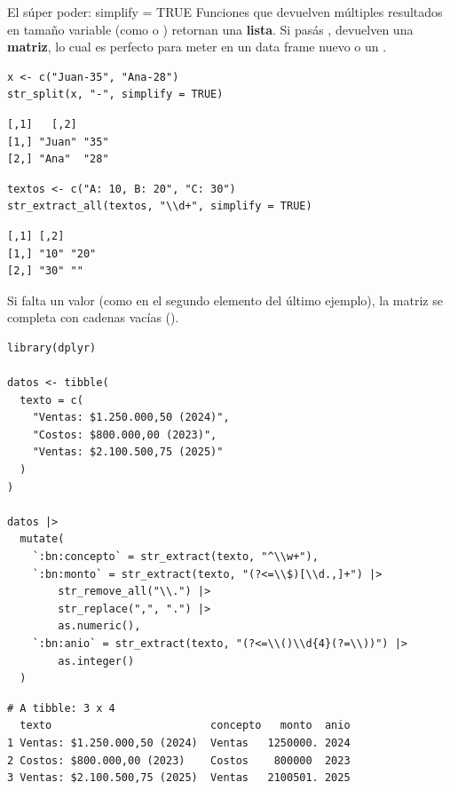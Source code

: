 \documentclass[8pt]{beamer}
\begin{document}
\begin{frame}[fragile]{El súper poder: simplify = TRUE}
	Funciones que devuelven múltiples resultados en tamaño variable (como  o ) retornan una \textbf{lista}. Si pasás , devuelven una \textbf{matriz}, lo cual es perfecto para meter en un data frame nuevo o un .
\begin{lstlisting}[style=RScript]
x <- c("Juan-35", "Ana-28")
str_split(x, "-", simplify = TRUE)
\end{lstlisting}
\begin{lstlisting}[style=RConsole]
     [,1]   [,2]
[1,] "Juan" "35"
[2,] "Ana"  "28"
\end{lstlisting}
\begin{lstlisting}[style=RScript]
textos <- c("A: 10, B: 20", "C: 30")
str_extract_all(textos, "\\d+", simplify = TRUE)
\end{lstlisting}
\begin{lstlisting}[style=RConsole]
     [,1] [,2]
[1,] "10" "20"
[2,] "30" ""
\end{lstlisting}
	\begin{alertblock}{}
		Si falta un valor (como en el segundo elemento del último ejemplo), la matriz se completa con cadenas vacías ().
	\end{alertblock}
\end{frame}




\begin{frame}[fragile]
\begin{lstlisting}[style=RScript, numbers=none]
library(dplyr)

datos <- tibble(
  texto = c(
    "Ventas: $1.250.000,50 (2024)",
    "Costos: $800.000,00 (2023)",
    "Ventas: $2.100.500,75 (2025)"
  )
)

datos |>
  mutate(
    `:bn:concepto` = str_extract(texto, "^\\w+"),
    `:bn:monto` = str_extract(texto, "(?<=\\$)[\\d.,]+") |>
      	str_remove_all("\\.") |>
      	str_replace(",", ".") |>
      	as.numeric(),
    `:bn:anio` = str_extract(texto, "(?<=\\()\\d{4}(?=\\))") |>
      	as.integer()
  )
\end{lstlisting}
\begin{lstlisting}[style=RConsole]
# A tibble: 3 x 4
  texto                         concepto   monto  anio
1 Ventas: $1.250.000,50 (2024)  Ventas   1250000. 2024
2 Costos: $800.000,00 (2023)    Costos    800000  2023
3 Ventas: $2.100.500,75 (2025)  Ventas   2100501. 2025
\end{lstlisting}
\end{frame}
\end{document}
